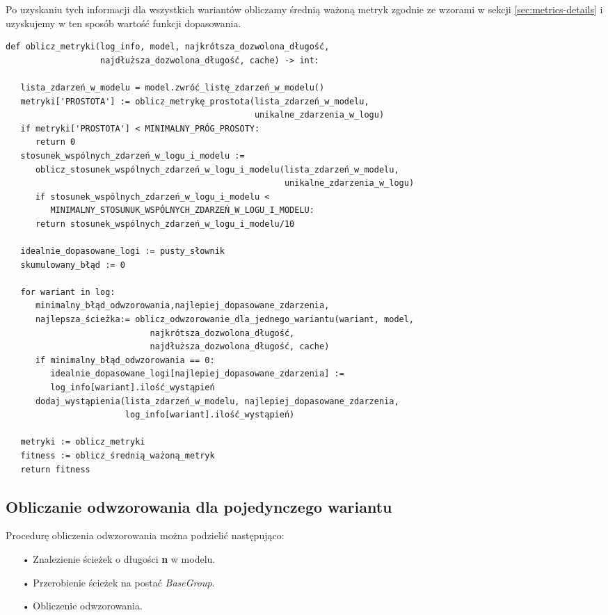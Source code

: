 Po uzyskaniu tych informacji dla wszystkich wariantów obliczamy średnią ważoną metryk zgodnie ze wzorami w sekcji \ref{sec:metrics-details} i uzyskujemy w ten sposób wartość funkcji dopasowania.
\clearpage
\lstset{caption=Pseudokod metody oblicz metryki, captionpos=b}
\lstset{label=src:obl_met, frame=single}
\begin{lstlisting}[escapeinside=``]
def oblicz_metryki(log_info, model, najkrótsza_dozwolona_długość, 
                   najdłuższa_dozwolona_długość, cache) -> int:
                   
   lista_zdarzeń_w_modelu = model.zwróć_listę_zdarzeń_w_modelu()
   metryki['PROSTOTA'] := oblicz_metrykę_prostota(lista_zdarzeń_w_modelu, 
                                                  unikalne_zdarzenia_w_logu)
   if metryki['PROSTOTA'] < MINIMALNY_PRÓG_PROSOTY:
      return 0
   stosunek_wspólnych_zdarzeń_w_logu_i_modelu := 
      oblicz_stosunek_wspólnych_zdarzeń_w_logu_i_modelu(lista_zdarzeń_w_modelu, 
                                                        unikalne_zdarzenia_w_logu)		   
      if stosunek_wspólnych_zdarzeń_w_logu_i_modelu <
         MINIMALNY_STOSUNUK_WSPÓLNYCH_ZDARZEŃ_W_LOGU_I_MODELU:
      return stosunek_wspólnych_zdarzeń_w_logu_i_modelu/10
        
   idealnie_dopasowane_logi := pusty_słownik
   skumulowany_błąd := 0
    
   for wariant in log:
      minimalny_błąd_odwzorowania,najlepiej_dopasowane_zdarzenia,
      najlepsza_ścieżka:= oblicz_odwzorowanie_dla_jednego_wariantu(wariant, model, 
                             najkrótsza_dozwolona_długość, 
                             najdłuższa_dozwolona_długość, cache)
      if minimalny_błąd_odwzorowania == 0:
         idealnie_dopasowane_logi[najlepiej_dopasowane_zdarzenia] := 
         log_info[wariant].ilość_wystąpień
      dodaj_wystąpienia(lista_zdarzeń_w_modelu, najlepiej_dopasowane_zdarzenia, 
                        log_info[wariant].ilość_wystąpień)

   metryki := oblicz_metryki 
   fitness := oblicz_średnią_ważoną_metryk
   return fitness
\end{lstlisting}

\subsection{Obliczanie odwzorowania dla pojedynczego wariantu}
Procedurę obliczenia odwzorowania można podzielić następująco:
\begin{itemize}
  \item[•] Znalezienie ścieżek o długości \textbf{n} w modelu.
  \item[•] Przerobienie ścieżek na postać \textit{BaseGroup}.
  \item[•] Obliczenie odwzorowania.
\end{itemize}

